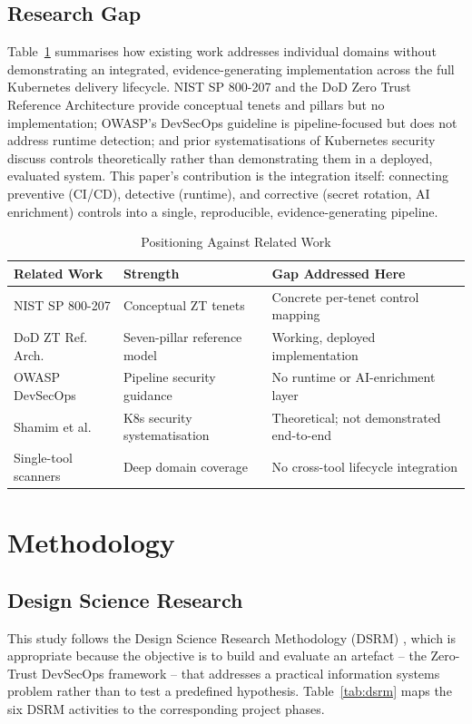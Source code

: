 \documentclass[conference]{IEEEtran}
\begin{document}
\subsection{Research Gap}
Table~\ref{tab:gap} summarises how existing work addresses individual domains without demonstrating an integrated, evidence-generating implementation across the full Kubernetes delivery lifecycle. NIST SP 800-207 and the DoD Zero Trust Reference Architecture provide conceptual tenets and pillars but no implementation; OWASP's DevSecOps guideline is pipeline-focused but does not address runtime detection; and prior systematisations of Kubernetes security \cite{shamim2020} discuss controls theoretically rather than demonstrating them in a deployed, evaluated system. This paper's contribution is the integration itself: connecting preventive (CI/CD), detective (runtime), and corrective (secret rotation, AI enrichment) controls into a single, reproducible, evidence-generating pipeline.

\begin{table}[!t]
\caption{Positioning Against Related Work}
\label{tab:gap}
\centering
\footnotesize
\begin{tabular}{@{}p{2.1cm}p{2.9cm}p{2.6cm}@{}}
\toprule
\textbf{Related Work} & \textbf{Strength} & \textbf{Gap Addressed Here} \\
\midrule
NIST SP 800-207 \cite{rose2020} & Conceptual ZT tenets & Concrete per-tenet control mapping \\
DoD ZT Ref. Arch. \cite{disa2021} & Seven-pillar reference model & Working, deployed implementation \\
OWASP DevSecOps \cite{owasp2023} & Pipeline security guidance & No runtime or AI-enrichment layer \\
Shamim et al. \cite{shamim2020} & K8s security systematisation & Theoretical; not demonstrated end-to-end \\
Single-tool scanners \cite{aqua2024,kyverno2024,falco2024} & Deep domain coverage & No cross-tool lifecycle integration \\
\bottomrule
\end{tabular}
\end{table}

\section{Methodology}

\subsection{Design Science Research}
This study follows the Design Science Research Methodology (DSRM) \cite{hevner2004,peffers2007}, which is appropriate because the objective is to build and evaluate an artefact -- the Zero-Trust DevSecOps framework -- that addresses a practical information systems problem rather than to test a predefined hypothesis. Table~\ref{tab:dsrm} maps the six DSRM activities to the corresponding project phases.
\end{document}
